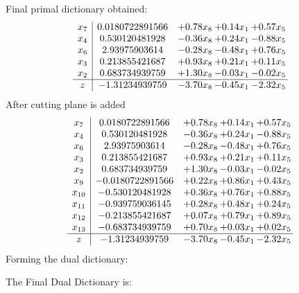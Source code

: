 \documentclass[8pt]{article}
\begin{document}
 Final primal dictionary obtained: 
\[\begin{array}{c| c c@{\hskip 2pt} c@{\hskip 2pt} c@{\hskip 2pt} }
 x_{7}   &  0.0180722891566 & +  0.78 x_{8} & +  0.14 x_{1} & +  0.57 x_{5}\\
 x_{4}   &  0.530120481928 & -0.36 x_{8} & +  0.24 x_{1} & -0.88 x_{5}\\
 x_{6}   &  2.93975903614 & -0.28 x_{8} & -0.48 x_{1} & +  0.76 x_{5}\\
 x_{3}   &  0.213855421687 & +  0.93 x_{8} & +  0.21 x_{1} & +  0.11 x_{5}\\
 x_{2}   &  0.683734939759 & +  1.30 x_{8} & -0.03 x_{1} & -0.02 x_{5}\\
\hline
z    &  -1.31234939759 & -3.70 x_{8} & -0.45 x_{1} & -2.32 x_{5}\\
\end{array}\]
 After cutting plane is added 
\[\begin{array}{c| c c@{\hskip 2pt} c@{\hskip 2pt} c@{\hskip 2pt} }
 x_{7}   &  0.0180722891566 & +  0.78 x_{8} & +  0.14 x_{1} & +  0.57 x_{5}\\
 x_{4}   &  0.530120481928 & -0.36 x_{8} & +  0.24 x_{1} & -0.88 x_{5}\\
 x_{6}   &  2.93975903614 & -0.28 x_{8} & -0.48 x_{1} & +  0.76 x_{5}\\
 x_{3}   &  0.213855421687 & +  0.93 x_{8} & +  0.21 x_{1} & +  0.11 x_{5}\\
 x_{2}   &  0.683734939759 & +  1.30 x_{8} & -0.03 x_{1} & -0.02 x_{5}\\
 x_{9}   &  -0.0180722891566 & +  0.22 x_{8} & +  0.86 x_{1} & +  0.43 x_{5}\\
 x_{10}   &  -0.530120481928 & +  0.36 x_{8} & +  0.76 x_{1} & +  0.88 x_{5}\\
 x_{11}   &  -0.939759036145 & +  0.28 x_{8} & +  0.48 x_{1} & +  0.24 x_{5}\\
 x_{12}   &  -0.213855421687 & +  0.07 x_{8} & +  0.79 x_{1} & +  0.89 x_{5}\\
 x_{13}   &  -0.683734939759 & +  0.70 x_{8} & +  0.03 x_{1} & +  0.02 x_{5}\\
\hline
z    &  -1.31234939759 & -3.70 x_{8} & -0.45 x_{1} & -2.32 x_{5}\\
\end{array}\]
Forming the dual dictionary:

The Final Dual Dictionary is: 
\end{document}

